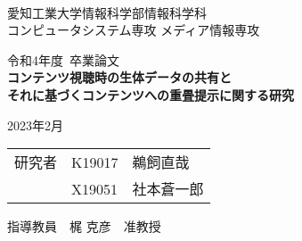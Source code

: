 \begin{titlepage}

\ \\
\begin{center}

{\LARGE 愛知工業大学情報科学部情報科学科\\
コンピュータシステム専攻 メディア情報専攻

\vspace{1.0cm}

令和4年度~卒業論文\\

\vspace{2.0cm}
{\Huge 
\baselineskip=15mm
\textbf{コンテンツ視聴時の生体データの共有と\\それに基づくコンテンツへの重畳提示に関する研究\\}}

\vspace{7.0cm}

2023年2月\\

\vspace{1.0cm}

\begin{tabular}[h]{lll}
  研究者  & K19017 & 鵜飼直哉\\
         & X19051 & 社本蒼一郎\\
\end{tabular}

\vspace{1.0cm}

指導教員\ \ 梶 克彦\ \ 准教授}

\end{center}

\end{titlepage}
    